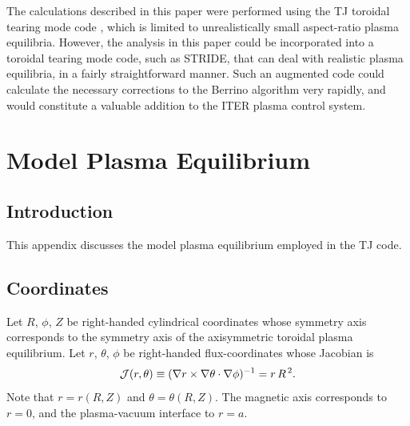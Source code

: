 \documentclass{iopjournal}
\begin{document}
{The calculations described in this paper were performed using the TJ toroidal tearing mode code \cite{tear9,tear10}, which is limited to unrealistically small aspect-ratio plasma equilibria. However, the
analysis in this paper could be incorporated into a toroidal tearing mode code, such as STRIDE, that can deal with realistic plasma equilibria, in a fairly
straightforward manner. Such an augmented code could calculate the necessary corrections to the Berrino algorithm very rapidly, and would constitute a
valuable addition to the ITER plasma control system. 



\appendix

\section{Model Plasma Equilibrium}\label{sequilb}

\subsection{Introduction}
This appendix discusses the model plasma equilibrium employed in the TJ code. 

\subsection{Coordinates}\label{coord}
Let $R$, $\phi$, $Z$ be right-handed cylindrical coordinates whose symmetry axis corresponds to the symmetry axis of the axisymmetric toroidal plasma equilibrium.
Let $r$, $\theta$, $\phi$ be right-handed flux-coordinates whose
Jacobian is
\begin{equation}\label{jac}
{\cal J}(r,\theta)\equiv (\nabla r\times \nabla\theta\cdot\nabla\phi)^{-1}= r\,R^{\,2}.
\end{equation}
Note that $r=r(R,Z)$ and $\theta=\theta(R,Z)$. 
The magnetic axis corresponds to $r=0$, and the plasma-vacuum interface to $r=a$. 

}
\end{document}
